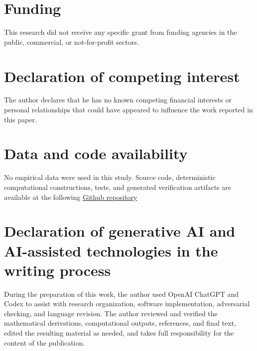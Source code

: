 {%


\section*{Funding}

This research did not receive any specific grant from funding agencies
in the public, commercial, or not-for-profit sectors.

\section*{Declaration of competing interest}

The author declares that he has no known competing financial interests
or personal relationships that could have appeared to influence the
work reported in this paper.

\section*{Data and code availability}

No empirical data were used in this study. Source code, deterministic
computational constructions, tests, and generated verification artifacts
are available at the following \href{https://github.com/matuteiglesias/concentration-is-not-scaling}{Github repository} 

\section*{
Declaration of generative AI and AI-assisted technologies in the
writing process
}

During the preparation of this work, the author used OpenAI ChatGPT and
Codex to assist with research organization, software implementation,
adversarial checking, and language revision. The author reviewed and
verified the mathematical derivations, computational outputs,
references, and final text, edited the resulting material as needed,
and takes full responsibility for the content of the publication.
}

